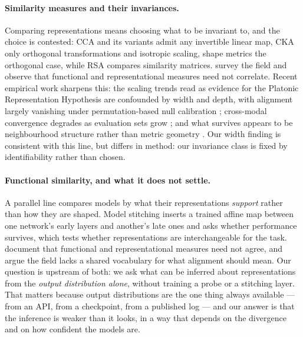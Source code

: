 \documentclass[10pt,letterpaper,twocolumn]{article}
\theoremstyle{plain}
\theoremstyle{definition}
\theoremstyle{remark}
\begin{document}
\paragraph{Similarity measures and their invariances.}
Comparing representations means choosing what to be invariant to, and the
choice is contested: CCA \citep{hotelling1936} and its variants
\citep{raghu2017,morcos2018} admit any invertible linear map, CKA
\citep{kornblith2019} only orthogonal transformations and isotropic scaling,
shape metrics \citep{williams2021} the orthogonal case, while RSA
\citep{kriegeskorte2008} compares similarity matrices. \citet{klabunde2025}
survey the field and observe that functional and representational measures need
not correlate. Recent empirical work sharpens this: the scaling trends read as
evidence for the Platonic Representation Hypothesis \citep{huh2024} are
confounded by width and depth, with alignment largely vanishing under
permutation-based null calibration \citep{aristotelian2026}; cross-modal
convergence degrades as evaluation sets grow \citep{platoscave2026}; and what
survives appears to be neighbourhood structure rather than metric geometry
\citep{structure2026}. Our width finding is consistent with this line, but
differs in method: our invariance class is fixed by identifiability rather than
chosen.

\paragraph{Functional similarity, and what it does not settle.}
A parallel line compares models by what their representations \emph{support}
rather than how they are shaped. Model stitching \citep{bansal2021} inserts a
trained affine map between one network's early layers and another's late ones
and asks whether performance survives, which tests whether representations are
interchangeable for the task. \citet{klabunde2025} document that functional and
representational measures need not agree, and \citet{sucholutsky2023} argue the
field lacks a shared vocabulary for what alignment should mean. Our question is
upstream of both: we ask what can be inferred about representations from the
\emph{output distribution alone}, without training a probe or a stitching
layer. That matters because output distributions are the one thing always
available --- from an API, from a checkpoint, from a published log --- and our
answer is that the inference is weaker than it looks, in a way that depends on
the divergence and on how confident the models are.
\end{document}
